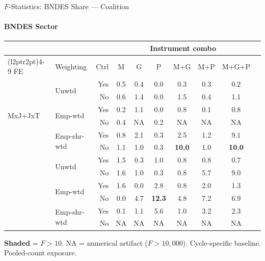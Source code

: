 \documentclass[aspectratio=169,10pt]{beamer}
\newcommand{\fpass}[1]{\cellcolor{pass}\textbf{#1}}
\begin{document}
\begin{frame}[t]{$F$-Statistics: BNDES Share --- Coalition}
\framesubtitle{BNDES Sector}
\begin{center}
\footnotesize
\setlength{\tabcolsep}{3.5pt}
\renewcommand{\arraystretch}{1.05}
\begin{tabular}{@{}llrccccccc@{}}
\toprule
 & & & \multicolumn{6}{c}{Instrument combo} \\
\cmidrule(l{2pt}r{2pt}){4-9}
FE & Weighting & Ctrl & M & G & P & M+G & M+P & M+G+P \\
\midrule
  \multirow{6}{*}{MxJ+JxT} & \multirow{2}{*}{Unwtd} & Yes & 0.5 & 0.4 & 0.0 & 0.3 & 0.3 & 0.2 \\
   &  & No & 0.6 & 1.4 & 0.0 & 1.5 & 0.4 & 1.1 \\
   & \multirow{2}{*}{Emp-wtd} & Yes & 0.2 & 1.1 & 0.0 & 0.8 & 0.1 & 0.8 \\
   &  & No & 0.4 & NA & 0.2 & NA & NA & NA \\
   & \multirow{2}{*}{Emp-shr-wtd} & Yes & 0.8 & 2.1 & 0.3 & 2.5 & 1.2 & 9.1 \\
   &  & No & 1.1 & 1.0 & 0.3 & \fpass{10.0} & 1.0 & \fpass{10.0} \\
\addlinespace[5pt]
  \multirow{6}{*}{MxJ+MxT} & \multirow{2}{*}{Unwtd} & Yes & 1.5 & 0.3 & 1.0 & 0.8 & 0.8 & 0.7 \\
   &  & No & 1.6 & 1.0 & 0.3 & 0.8 & 5.7 & 9.0 \\
   & \multirow{2}{*}{Emp-wtd} & Yes & 1.6 & 0.0 & 2.8 & 0.8 & 2.0 & 1.3 \\
   &  & No & 0.0 & 4.7 & \fpass{12.3} & 4.8 & 7.2 & 6.9 \\
   & \multirow{2}{*}{Emp-shr-wtd} & Yes & 0.1 & 1.1 & 5.6 & 1.0 & 3.2 & 2.3 \\
   &  & No & NA & NA & NA & NA & NA & NA \\
\bottomrule
\end{tabular}
\end{center}
{\scriptsize \colorbox{pass}{\textbf{Shaded}} = $F>10$. NA = numerical artifact ($F>10{,}000$). Cycle-specific baseline. Pooled-count exposure.}
\end{frame}
\end{document}
